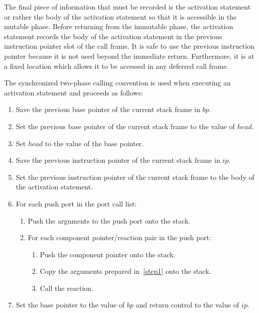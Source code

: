 The final piece of information that must be recorded is the activation statement or rather the body of the activation statement so that it is accessible in the mutable phase.
Before returning from the immutable phase, the activation statement records the body of the activation statement in the previous instruction pointer slot of the call frame.
It is safe to use the previous instruction pointer because it is not used beyond the immediate return.
Furthermore, it is at a fixed location which allows it to be accessed in any deferred call frame.

The synchronized two-phase calling convention is used when executing an activation statement and proceeds as follows:
\begin{enumerate}
\item Save the previous base pointer of the current stack frame in $bp$.
\item Set the previous base pointer of the current stack frame to the value of $head$.
\item Set $head$ to the value of the base pointer.
\item Save the previous instruction pointer of the current stack frame in $ip$.
\item Set the previous instruction pointer of the current stack frame to the body of the activation statement.
\item For each push port in the port call list:
  \begin{enumerate}
  \item Push the arguments to the push port onto the stack.\label{step1}
  \item For each component pointer/reaction pair in the push port:
    \begin{enumerate}
    \item Push the component pointer onto the stack.
    \item Copy the arguments prepared in~\ref{step1} onto the stack.
    \item Call the reaction.
    \end{enumerate}
  \end{enumerate}
\item Set the base pointer to the value of $bp$ and return control to the value of $ip$.
\end{enumerate}

